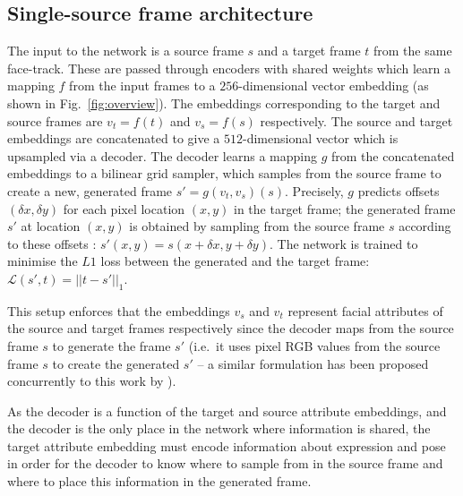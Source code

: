 \documentclass{bmvc2k}
\newcommand{\figref}[1]{Fig.~\ref{#1}}
\begin{document}
\subsection{Single-source frame architecture}
\label{sec:singlesource}
The input to the network is a source frame $s$ and a target frame $t$ from the same face-track.
These are passed through encoders with shared weights which learn a mapping $f$ from the input frames to a $256$-dimensional vector embedding (as shown in \figref{fig:overview}).
The embeddings corresponding to the target and source frames are
 $v_{t} = f(t)$ and $v_{s} = f(s)$ respectively.
The source and target embeddings are concatenated to give a $512$-dimensional vector which is upsampled via a decoder.
The decoder learns a mapping $g$ from the concatenated embeddings to a bilinear grid sampler, which samples from the source frame to create a new, generated frame $s' = g(v_t, v_{s}) (s)$.
Precisely, $g$ predicts offsets $(\delta x, \delta y)$ for each pixel location $(x,y)$ in the target frame; the generated frame $s'$ at location $(x,y)$ is obtained by sampling from the source frame $s$ according to these offsets : $s'{(x,y)} = s{(x+\delta x, y+\delta y)}$.
The network is trained to minimise the $L1$ loss between the generated and the target frame: $\mathcal{L}(s',t) = || t - s' ||_1$.


This setup enforces that the embeddings $v_s$ and $v_t$ represent facial attributes of the source and target frames respectively since the decoder maps  from the source frame $s$ to generate the frame $s'$ (i.e.\ it uses pixel RGB values from the source frame $s$ to create the generated $s'$ -- a similar formulation has been proposed concurrently to this work by \cite{vondrick2018tracking}). 

As the decoder is a function of the target and source attribute embeddings, and the decoder is the only place in the network where information is shared, the target attribute embedding must encode information about expression and pose
in order for the decoder to know where to sample
from in the source frame and where to place this information in the
generated frame.
\end{document}
